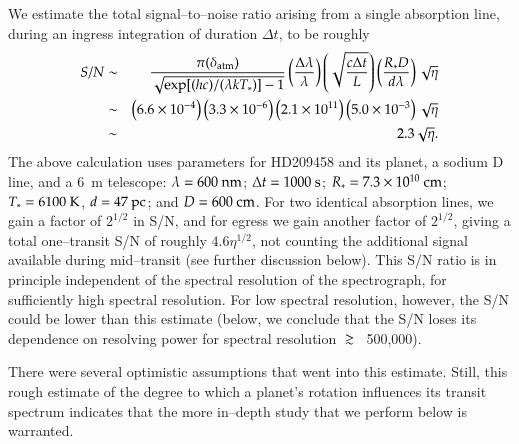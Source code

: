 We estimate the total signal--to--noise ratio arising from a single
absorption line, during an ingress integration of duration $\Delta t$, to be
roughly
\begin{eqnarray}
\nonumber S/N & \sim & \frac{\pi(\delta_{\rm atm})}{\sqrt{\exp[(h c)/(\lambda k T_*)] -1}} \left( \frac{ \Delta \lambda}{\lambda} \right) \left( \sqrt{\frac{c \Delta t}{ L}} \right) \left( \frac{R_* D}{d \lambda} \right) \sqrt{\eta} \\
\nonumber & \sim & \left( 6.6\times 10^{-4} \right) \left( 3.3\times 10^{-6} \right) \left( 2.1\times 10^{11} \right) \left( 5.0\times 10^{-3} \right) \sqrt{\eta} \\
\label{rot_eq:SN estimate} & \sim & 2.3 \sqrt{\eta}.
\end{eqnarray}
The above calculation uses parameters for HD209458 and its planet, a
sodium D line, and a 6~m telescope: $\lambda = 600 {\rm~nm}$; $\Delta
t = 1000 {\rm~s}$; $R_* = 7.3\times 10^{10} {\rm~cm}$; $T_* = 6100
{\rm ~K}$, $d = 47 {\rm~pc}$; and $D = 600 {\rm~cm}$.  For two
identical absorption lines, we gain a factor of $2^{1/2}$ in S/N, and
for egress we gain another factor of $2^{1/2}$, giving a total
one--transit S/N of roughly $4.6 \eta^{1/2}$, not counting the
additional signal available during mid--transit (see further
discussion below).  This S/N ratio is in principle independent of the
spectral resolution of the spectrograph, for sufficiently high
spectral resolution.  For low spectral resolution, however, the S/N
could be lower than this estimate (below, we conclude that the S/N
loses its dependence on resolving power for spectral resolution
$\gsim$~500,000).

There were several optimistic assumptions that went into this
estimate.  Still, this rough estimate of the degree to which a
planet's rotation influences its transit spectrum indicates that the
more in--depth study that we perform below is warranted.

